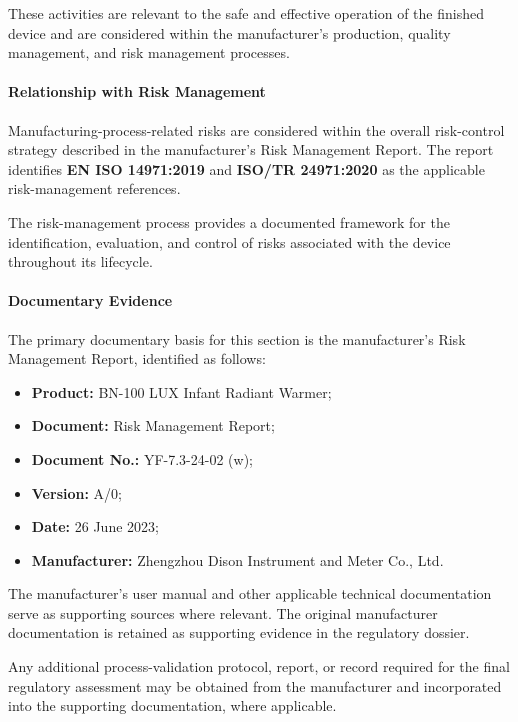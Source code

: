 These activities are relevant to the safe and effective operation
of the finished device and are considered within the manufacturer's
production, quality management, and risk management processes.

\paragraph{Relationship with Risk Management}

Manufacturing-process-related risks are considered within the
overall risk-control strategy described in the manufacturer's
Risk Management Report. The report identifies
\textbf{EN ISO 14971:2019} and \textbf{ISO/TR 24971:2020} as the
applicable risk-management references.

The risk-management process provides a documented framework for
the identification, evaluation, and control of risks associated
with the device throughout its lifecycle.

\paragraph{Documentary Evidence}

The primary documentary basis for this section is the manufacturer's
Risk Management Report, identified as follows:

\begin{itemize}
    \item \textbf{Product:} BN-100 LUX Infant Radiant Warmer;
    \item \textbf{Document:} Risk Management Report;
    \item \textbf{Document No.:} YF-7.3-24-02 (w);
    \item \textbf{Version:} A/0;
    \item \textbf{Date:} 26 June 2023;
    \item \textbf{Manufacturer:} Zhengzhou Dison Instrument and Meter
    Co., Ltd.
\end{itemize}

The manufacturer's user manual and other applicable technical
documentation serve as supporting sources where relevant. The
original manufacturer documentation is retained as supporting
evidence in the regulatory dossier.

Any additional process-validation protocol, report, or record
required for the final regulatory assessment may be obtained from
the manufacturer and incorporated into the supporting documentation,
where applicable.
